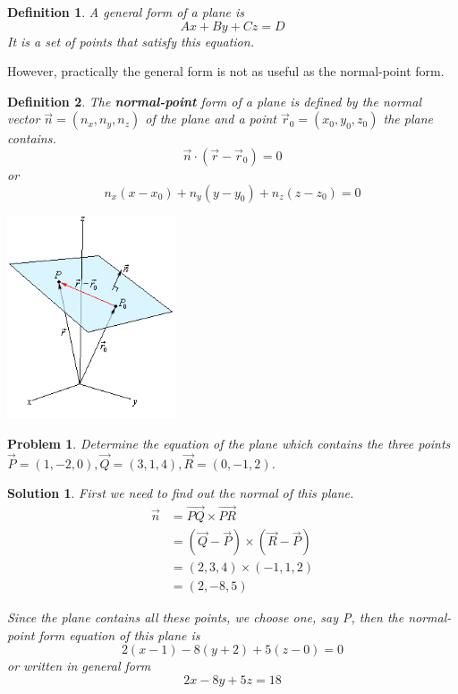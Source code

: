 \documentclass{article}
\newtheorem{definition}{Definition}
\newtheorem{problem}{Problem}
\newtheorem{solution}{Solution}
\begin{document}
\begin{definition}
	A general form of a plane is 
	\[ Ax + By + Cz = D \]
	It is a set of points that satisfy this equation.
\end{definition}

However, practically the general form is not as useful as the normal-point form.

\begin{definition}
	The \textbf{normal-point} form of a plane is defined by the normal vector $\vec{n} = (n_x,n_y,n_z)$ of the plane and a point $\vec{r}_0 = (x_0,y_0,z_0)$ the plane contains.
	\[ \vec{n}\cdot(\vec{r}-\vec{r}_0) = 0 \]
	or 
	\[ n_x(x-x_0) + n_y(y-y_0) + n_z(z-z_0) = 0 \]
	
	\begin{center}
		\includegraphics*[width=5cm]{plane.png}
	\end{center}
	
\end{definition} 

\begin{problem}
	Determine the equation of the plane which contains the three points $\vec{P}=(1,-2,0),\vec{Q}=(3,1,4),\vec{R}=(0,-1,2)$. 
\end{problem}
\begin{solution}
	First we need to find out the normal of this plane.
	\begin{align*}
	\vec{n} &= \overrightarrow{PQ}\times\overrightarrow{PR}\\ 
	&= (\vec{Q}-\vec{P})\times(\vec{R}-\vec{P})\\
	&= (2,3,4) \times (-1,1,2)\\
	&= (2,-8,5)
	\end{align*}
	
	Since the plane contains all these points, we choose one, say P, then the normal-point form equation of this plane is 
	\[ 2(x-1)-8(y+2)+5(z-0)=0 \]
	or written in general form
	\[ 2x-8y+5z = 18 \] 
\end{solution}
\end{document}
